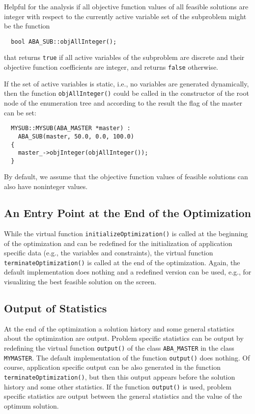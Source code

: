 Helpful for the analysis if all objective function values of all feasible
solutions are integer with respect to the currently active variable
set of the subproblem might be the function
\begin{verbatim}
  bool ABA_SUB::objAllInteger();
\end{verbatim}
\noindent
that returns {\tt true} if all active variables of the subproblem are discrete
and their objective function coefficients
are integer, and returns
{\tt false} otherwise.

If the set of active variables is static, i.e.,
no variables are generated dynamically,
then the function {\tt objAllInteger()} could be called in the constructor
of the root node of the enumeration tree and according to the result
the flag of the master can be set:
\begin{verbatim}
  MYSUB::MYSUB(ABA_MASTER *master) :
    ABA_SUB(master, 50.0, 0.0, 100.0)
  {
    master_->objInteger(objAllInteger());
  }
\end{verbatim}
By default, we assume that the objective function values of feasible
solutions can also have noninteger values.

\subsection{An Entry Point at the End of the Optimization}

While the virtual function 
{\tt initializeOptimization()} is called at
the beginning of the optimization and can be redefined for the
initialization of application specific data (e.g., the variables 
and constraints), the virtual function 
{\tt terminateOptimization()}
is called at the end of the optimization. Again, the default implementation
does nothing and a redefined version can be used, e.g., for visualizing
the best feasible solution on the screen.

\subsection{Output of Statistics}

At the end of the optimization a solution history and some general
statistics about the optimization are output. Problem specific 
statistics can be output by redefining the virtual function
{\tt output()} of the class {\tt ABA\_MASTER} in the class 
{\tt MYMASTER}. The default implementation of the 
function {\tt output()}
does nothing. Of course, application specific output can be also
generated in the function {\tt terminateOptimization()}, but then
this output appears before the solution history and some other
statistics. If the function {\tt output()} is used, problem specific
statistics are output between the general statistics and the value
of the optimum solution.

